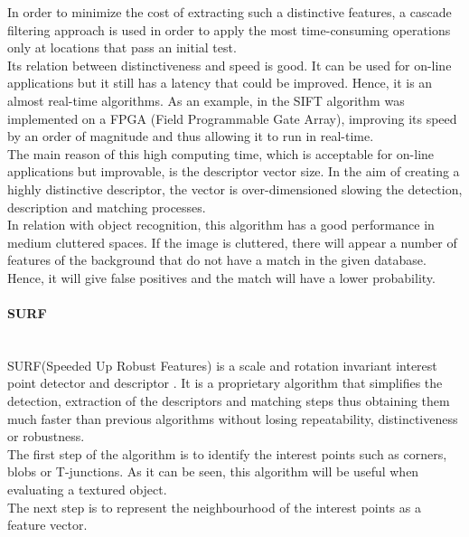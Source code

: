 In order to minimize the cost of extracting such a distinctive features, a cascade filtering approach is used in order to apply the most time-consuming operations only at locations that pass an initial test. 
\\

Its relation between distinctiveness and speed is good. It can be used for on-line applications but it still has a latency that could be improved. Hence, it is an almost real-time algorithms. As an example, in \cite{sift_fpga} the SIFT algorithm was implemented on a FPGA (Field Programmable Gate Array), improving its speed by an order of magnitude and thus allowing it to run in real-time.
\\

The main reason of this high computing time, which is acceptable for on-line applications but improvable, is the descriptor vector size. In the aim of creating a highly distinctive descriptor, the vector is over-dimensioned slowing the detection, description and matching processes. 
\\

In relation with object recognition, this algorithm has a good performance in medium cluttered spaces. If the image is cluttered, there will appear a number of features of the background that do not have a match in the given database. Hence, it will give false positives and the match will have a lower probability. 




\paragraph{SURF}\mbox{}\\

SURF(Speeded Up Robust Features) is a scale and rotation invariant interest point detector and descriptor \cite{surf}. 
It is a proprietary algorithm that simplifies the detection, extraction of the descriptors and matching steps thus obtaining them much faster than previous algorithms without losing repeatability, distinctiveness or robustness. 
\\

The first step of the algorithm is to identify the interest points such as corners, blobs or T-junctions. As it can be seen, this algorithm will be useful when evaluating a textured object. 
\\

The next step is to represent the neighbourhood of the interest points as a feature vector. 
\\

